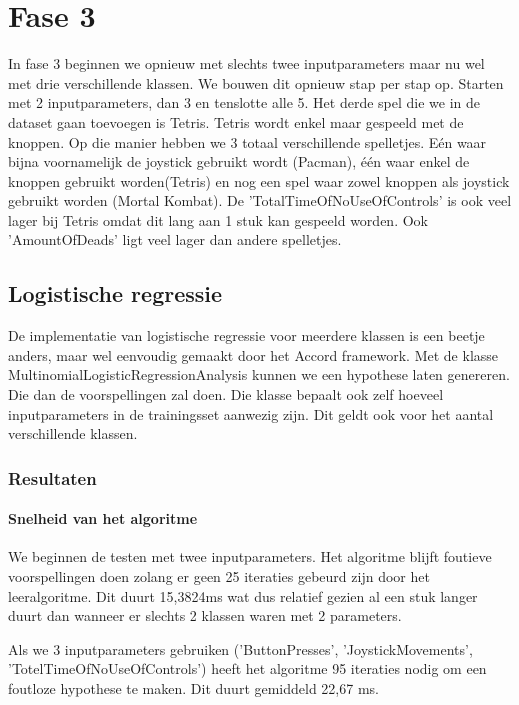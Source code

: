 
\newpage
\section{Fase 3}
\label{sec:Fase3}

In fase 3 beginnen we opnieuw met slechts twee inputparameters maar nu wel met drie verschillende klassen. We bouwen dit opnieuw stap per stap op. Starten met 2 inputparameters, dan 3 en tenslotte alle 5. Het derde spel die we in de dataset gaan toevoegen is Tetris. Tetris wordt enkel maar gespeeld met de knoppen. Op die manier hebben we 3 totaal verschillende spelletjes. Eén waar bijna voornamelijk de joystick gebruikt wordt (Pacman), één waar enkel de knoppen gebruikt worden(Tetris) en nog een spel waar zowel knoppen als joystick gebruikt worden (Mortal Kombat). De 'TotalTimeOfNoUseOfControls' is ook veel lager bij Tetris omdat dit lang aan 1 stuk kan gespeeld worden. Ook 'AmountOfDeads' ligt veel lager dan andere spelletjes. 


\subsection{Logistische regressie}
\label{sec:Logistischeregressie-fase3}

De implementatie van logistische regressie voor meerdere klassen is een beetje anders, maar wel eenvoudig gemaakt door het Accord framework. Met de klasse MultinomialLogisticRegressionAnalysis kunnen we een hypothese laten genereren. Die dan de voorspellingen zal doen. Die klasse bepaalt ook zelf hoeveel inputparameters in de trainingsset aanwezig zijn. Dit geldt ook voor het aantal verschillende klassen.

\subsubsection{Resultaten}
\paragraph{Snelheid van het algoritme} 
We beginnen de testen met twee inputparameters. Het algoritme blijft foutieve voorspellingen doen zolang er geen 25 iteraties gebeurd zijn door het leeralgoritme. Dit duurt 15,3824ms wat dus relatief gezien al een stuk langer duurt dan wanneer er slechts 2 klassen waren met 2 parameters. 

Als we 3 inputparameters gebruiken ('ButtonPresses', 'JoystickMovements', 'TotelTimeOfNoUseOfControls') heeft het algoritme 95 iteraties nodig om een foutloze hypothese te maken. Dit duurt gemiddeld 22,67 ms. 


